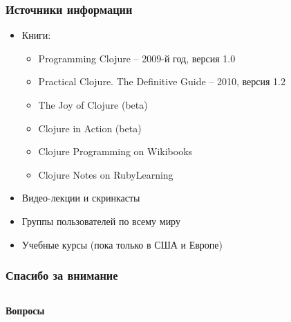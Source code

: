 \documentclass[ignorenonframetext]{beamer}
\begin{document}
\begin{frame}[t]
  \frametitle{Источники информации}
  \begin{itemize}
  \item Книги:
    \begin{itemize}
    \item Programming Clojure -- 2009-й год, версия 1.0
    \item Practical Clojure. The Definitive Guide -- 2010, версия 1.2
    \item The Joy of Clojure (beta)
    \item Clojure in Action (beta)
    \item Clojure Programming on Wikibooks
    \item Clojure Notes on RubyLearning
    \end{itemize}
  \item Видео-лекции и скринкасты
  \item Группы пользователей по всему миру
  \item Учебные курсы (пока только в США и Европе)
  \end{itemize}
\end{frame}

\begin{frame}[t]
  \frametitle{Спасибо за внимание}
  \begin{columns}
    \begin{column}{0.65\textwidth}
\raggedleft       \Huge{\textbf{Вопросы}} 
    \end{column}
    \begin{column}{0.35\textwidth}
    \end{column}
  \end{columns}
\end{frame}
\end{document}
